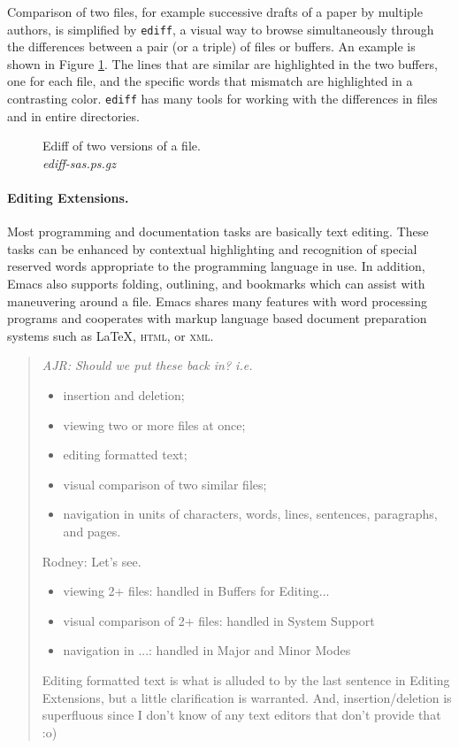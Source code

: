 \documentclass{article}
\newif\ifdraft
\newcommand{\stexttt}[1]{{\small\texttt{#1}}}
\newcommand{\emptyfig}{
\hspace*{42pt}\rule{324pt}{.25pt}\\
\hspace*{42pt}\rule{.25pt}{10pc}
\rule{316pt}{.25pt}
\rule{.25pt}{10pc}}
\newenvironment{Comment}{\begin{quote}\small\itshape }{\end{quote}}
\begin{document}
Comparison of two files, for example successive drafts of a paper
by multiple authors, is simplified by \stexttt{ediff}, a visual 
way to browse simultaneously through
the differences between a pair (or a triple) of files or buffers.
An example is shown in Figure \ref{f.ediff}.  The lines that are similar
are highlighted in the two buffers, one for each file, and the specific
words that mismatch are highlighted in a contrasting color.
\stexttt{ediff} has many tools for working with the differences in
files and in entire directories.

\begin{figure}
\ifdraft
  \emptyfig
\else
\fi
\caption[Ediff of two versions of a file.]{Ediff of two versions of a file.\\
{\it ediff-sas.ps.gz}
\label{f.ediff}}
\end{figure}

\paragraph{Editing Extensions.}
Most programming and documentation tasks are basically text editing.
These tasks can be enhanced by %
contextual highlighting and recognition of special reserved words
appropriate to the programming language in use.  In addition, Emacs
also supports folding, outlining, and bookmarks which can assist with
maneuvering around a file.  Emacs shares many features with word
processing programs and cooperates with markup language based document
preparation systems such as \LaTeX, \textsc{html}, or \textsc{xml}.

\begin{Comment}
  AJR: Should we put these back in? i.e.   
  \begin{itemize}
  \item insertion and deletion;
  \item viewing two or more files at once;
  \item editing formatted text;
  \item visual comparison of two similar files;
  \item navigation in units of characters, words, lines, sentences,
    paragraphs, and pages.
  \end{itemize}

Rodney:  Let's see. 
\begin{itemize}  
\item viewing 2+ files:  handled in Buffers for Editing...
\item visual comparison of 2+ files:  handled in System Support
\item navigation in ...:  handled in Major and Minor Modes
\end{itemize}
Editing formatted text is what is alluded to by the last sentence 
in Editing Extensions, but a little clarification is warranted.  And,
insertion/deletion is superfluous since I don't know of any text
editors that don't provide that :o)

\end{Comment}
\end{document}
